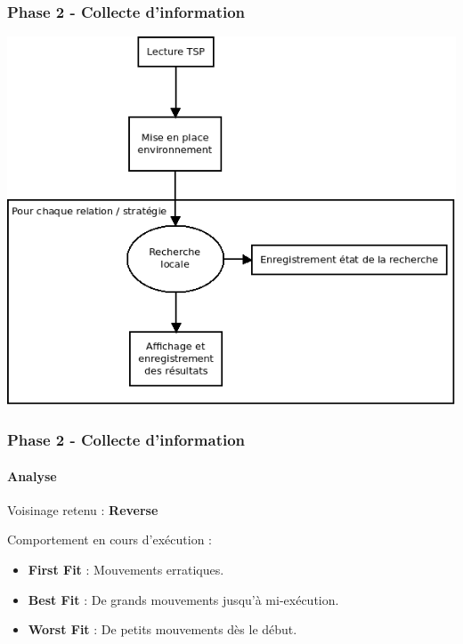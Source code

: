 \documentclass{beamer}
\begin{document}
\begin{frame}
  \frametitle{Phase 2 - Collecte d'information}
  
  \begin{center}
    \includegraphics[width=\textwidth,height=0.8\textheight]{images/exec-phase-2.png}
  \end{center}
  
\end{frame}


\begin{frame}
  \frametitle{Phase 2 - Collecte d'information}
  \framesubtitle{Analyse}
  
  Voisinage retenu : \textbf{Reverse}
  
  Comportement en cours d'exécution :
  \begin{itemize}
    \item \textbf{First Fit} : Mouvements erratiques.
    \item \textbf{Best Fit} : De grands mouvements jusqu'à mi-exécution.
    \item \textbf{Worst Fit} : De petits mouvements dès le début.
  \end{itemize}
  
\end{frame}
\end{document}

